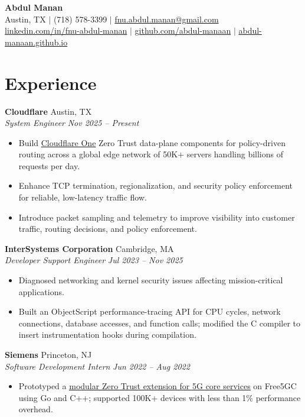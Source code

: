 \documentclass[letterpaper,10pt]{article}
\newcommand{\role}[4]{\textbf{#1} \hfill #2\\\textit{#3} \hfill \textit{#4}\par}
\begin{document}
\begin{center}
{\LARGE\bfseries Abdul Manan}\\[3pt]
Austin, TX $|$ (718) 578-3399 $|$ \href{mailto:fnu.abdul.manan@gmail.com}{fnu.abdul.manan@gmail.com}\\[1pt]
\href{https://www.linkedin.com/in/fnu-abdul-manan}{linkedin.com/in/fnu-abdul-manan} $|$
\href{https://github.com/abdul-manaan}{github.com/abdul-manaan} $|$
\href{https://abdul-manaan.github.io}{abdul-manaan.github.io}
\end{center}
\vspace{-10pt}
\section{Experience}
\role{Cloudflare}{Austin, TX}{System Engineer}{Nov 2025 -- Present}
\begin{itemize}
\item Build \href{https://developers.cloudflare.com/cloudflare-one/}{Cloudflare One} Zero Trust data-plane components for policy-driven routing across a global edge network of 50K+ servers handling billions of requests per day.
\item Enhance TCP termination, regionalization, and security policy enforcement for reliable, low-latency traffic flow.
\item Introduce packet sampling and telemetry to improve visibility into customer traffic, routing decisions, and policy enforcement.
\end{itemize}
\vspace{2pt}
\role{InterSystems Corporation}{Cambridge, MA}{Developer Support Engineer}{Jul 2023 -- Nov 2025}
\begin{itemize}
\item Diagnosed networking and kernel security issues affecting mission-critical applications.
\item Built an ObjectScript performance-tracing API for CPU cycles, network connections, database accesses, and function calls; modified the C compiler to insert instrumentation hooks during compilation.
\end{itemize}
\vspace{2pt}
\role{Siemens}{Princeton, NJ}{Software Development Intern}{Jun 2022 -- Aug 2022}
\begin{itemize}
\item Prototyped a \href{https://doi.org/10.1109/AICCSA56895.2022.10017774}{\underline{modular Zero Trust extension for 5G core services}} on Free5GC using Go and C++; supported 100K+ devices with less than 1\% performance overhead.
\end{itemize}
\end{document}
